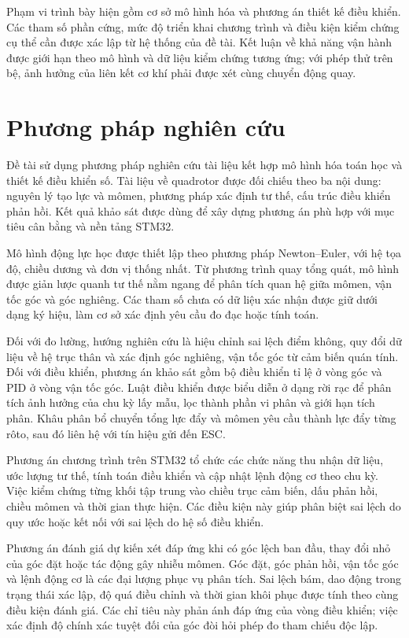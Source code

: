 Phạm vi trình bày hiện gồm cơ sở mô hình hóa và phương án thiết kế điều khiển. Các tham số phần cứng, mức độ triển khai chương trình và điều kiện kiểm chứng cụ thể cần được xác lập từ hệ thống của đề tài. Kết luận về khả năng vận hành được giới hạn theo mô hình và dữ liệu kiểm chứng tương ứng; với phép thử trên bệ, ảnh hưởng của liên kết cơ khí phải được xét cùng chuyển động quay.

\section{Phương pháp nghiên cứu}
\label{sec:introduction-methods}

Đề tài sử dụng phương pháp nghiên cứu tài liệu kết hợp mô hình hóa toán học và thiết kế điều khiển số. Tài liệu về quadrotor được đối chiếu theo ba nội dung: nguyên lý tạo lực và mômen, phương pháp xác định tư thế, cấu trúc điều khiển phản hồi. Kết quả khảo sát được dùng để xây dựng phương án phù hợp với mục tiêu cân bằng và nền tảng STM32.

Mô hình động lực học được thiết lập theo phương pháp Newton--Euler, với hệ tọa độ, chiều dương và đơn vị thống nhất. Từ phương trình quay tổng quát, mô hình được giản lược quanh tư thế nằm ngang để phân tích quan hệ giữa mômen, vận tốc góc và góc nghiêng. Các tham số chưa có dữ liệu xác nhận được giữ dưới dạng ký hiệu, làm cơ sở xác định yêu cầu đo đạc hoặc tính toán.

Đối với đo lường, hướng nghiên cứu là hiệu chỉnh sai lệch điểm không, quy đổi dữ liệu về hệ trục thân và xác định góc nghiêng, vận tốc góc từ cảm biến quán tính. Đối với điều khiển, phương án khảo sát gồm bộ điều khiển tỉ lệ ở vòng góc và PID ở vòng vận tốc góc. Luật điều khiển được biểu diễn ở dạng rời rạc để phân tích ảnh hưởng của chu kỳ lấy mẫu, lọc thành phần vi phân và giới hạn tích phân. Khâu phân bổ chuyển tổng lực đẩy và mômen yêu cầu thành lực đẩy từng rôto, sau đó liên hệ với tín hiệu gửi đến ESC.

Phương án chương trình trên STM32 tổ chức các chức năng thu nhận dữ liệu, ước lượng tư thế, tính toán điều khiển và cập nhật lệnh động cơ theo chu kỳ. Việc kiểm chứng từng khối tập trung vào chiều trục cảm biến, dấu phản hồi, chiều mômen và thời gian thực hiện. Các điều kiện này giúp phân biệt sai lệch do quy ước hoặc kết nối với sai lệch do hệ số điều khiển.

Phương án đánh giá dự kiến xét đáp ứng khi có góc lệch ban đầu, thay đổi nhỏ của góc đặt hoặc tác động gây nhiễu mômen. Góc đặt, góc phản hồi, vận tốc góc và lệnh động cơ là các đại lượng phục vụ phân tích. Sai lệch bám, dao động trong trạng thái xác lập, độ quá điều chỉnh và thời gian khôi phục được tính theo cùng điều kiện đánh giá. Các chỉ tiêu này phản ánh đáp ứng của vòng điều khiển; việc xác định độ chính xác tuyệt đối của góc đòi hỏi phép đo tham chiếu độc lập.
\par
\endgroup
